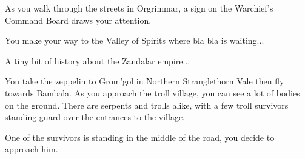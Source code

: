 As you walk through the streets in Orgrimmar, a sign on the Warchief's Command Board draws your attention.


You make your way to the Valley of Spirits where bla bla is waiting...



A tiny bit of history about the Zandalar empire...





You take the zeppelin to Grom'gol in Northern Stranglethorn Vale then fly towards Bambala. As you approach the troll village, you can see a lot of bodies on the ground. There are serpents and trolls alike, with a few troll survivors standing guard over the entrances to the village.


One of the survivors is standing in the middle of the road, you decide to approach him.








